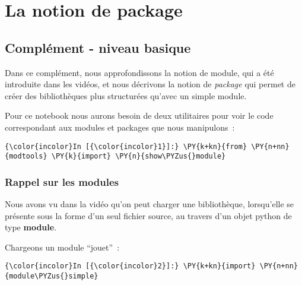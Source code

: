     
    
    
    

    

    \hypertarget{la-notion-de-package}{%
\section{La notion de package}\label{la-notion-de-package}}

    \hypertarget{compluxe9ment---niveau-basique}{%
\subsection{Complément - niveau
basique}\label{compluxe9ment---niveau-basique}}

    Dans ce complément, nous approfondissons la notion de module, qui a été
introduite dans les vidéos, et nous décrivons la notion de
\emph{package} qui permet de créer des bibliothèques plus structurées
qu'avec un simple module.

    Pour ce notebook nous aurons besoin de deux utilitaires pour voir le
code correspondant aux modules et packages que nous manipulons~:

    \begin{Verbatim}[commandchars=\\\{\},frame=single,framerule=0.3mm,rulecolor=\color{cellframecolor}]
{\color{incolor}In [{\color{incolor}1}]:} \PY{k+kn}{from} \PY{n+nn}{modtools} \PY{k}{import} \PY{n}{show\PYZus{}module}
\end{Verbatim}


    \hypertarget{rappel-sur-les-modules}{%
\subsubsection{Rappel sur les modules}\label{rappel-sur-les-modules}}

    Nous avons vu dans la vidéo qu'on peut charger une bibliothèque,
lorsqu'elle se présente sous la forme d'un seul fichier source, au
travers d'un objet python de type \textbf{module}.

    Chargeons un module ``jouet''~:

    \begin{Verbatim}[commandchars=\\\{\},frame=single,framerule=0.3mm,rulecolor=\color{cellframecolor}]
{\color{incolor}In [{\color{incolor}2}]:} \PY{k+kn}{import} \PY{n+nn}{module\PYZus{}simple}
\end{Verbatim}


